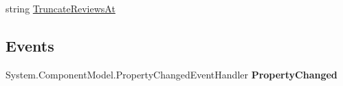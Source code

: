 \begin{DoxyCompactItemize}
\begin{DoxyCompactList}\small\item\em \end{DoxyCompactList}\item 
\hypertarget{class_price___comparison_1_1amazon_1_1ecs_1_1_item_lookup_request_a3ca6e82590464e062ea36d3cecce70bb}{string \hyperlink{class_price___comparison_1_1amazon_1_1ecs_1_1_item_lookup_request_a3ca6e82590464e062ea36d3cecce70bb}{Truncate\-Reviews\-At}}\label{class_price___comparison_1_1amazon_1_1ecs_1_1_item_lookup_request_a3ca6e82590464e062ea36d3cecce70bb}

\begin{DoxyCompactList}\small\item\em \end{DoxyCompactList}\end{DoxyCompactItemize}
\subsection*{Events}
\begin{DoxyCompactItemize}
\item 
\hypertarget{class_price___comparison_1_1amazon_1_1ecs_1_1_item_lookup_request_a657e6abeee18b752d786e64c48974a9b}{System.\-Component\-Model.\-Property\-Changed\-Event\-Handler {\bfseries Property\-Changed}}\label{class_price___comparison_1_1amazon_1_1ecs_1_1_item_lookup_request_a657e6abeee18b752d786e64c48974a9b}

\end{DoxyCompactItemize}
